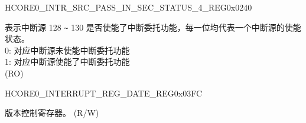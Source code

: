 \begin{register}{H}{CORE0\_INTR\_SRC\_PASS\_IN\_SEC\_STATUS\_4\_REG}{0x0240}\label{regdesc:CORE0INTRSRCPASSINSECSTATUS4REG}
%
\regnewline%
\begin{regdesc}\begin{reglist}
\label{fielddesc:CORE0INTRSRCPASSINSECSTATUS4}\item [CORE0\_INTR\_SRC\_PASS\_IN\_SEC\_STATUS\_4] 表示中断源 128 \verb+~+ 130 是否使能了中断委托功能，每一位均代表一个中断源的使能状态。\\
0: 对应中断源未使能中断委托功能\\
1: 对应中断源使能了中断委托功能\\
(RO)
\end{reglist}\end{regdesc}
\end{register}

\begin{register}{H}{CORE0\_INTERRUPT\_REG\_DATE\_REG}{0x03FC}\label{regdesc:CORE0INTERRUPTREGDATEREG}
%
%
\regnewline%
\begin{regdesc}\begin{reglist}
\label{fielddesc:CORE0INTERRUPTREGDATE}\item [CORE0\_INTERRUPT\_REG\_DATE] 版本控制寄存器。 (R/W)
\end{reglist}\end{regdesc}
\end{register}

